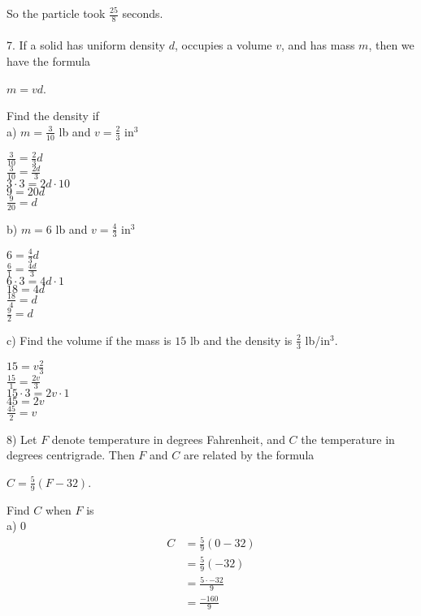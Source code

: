 \documentclass[12pt]{article}
\begin{document}
So the particle took $\displaystyle \frac{25}{8}$ seconds. \\
\\
7. If a solid has uniform density $d$, occupies a volume $v$, and has mass $m$, then we have the formula
\begin{center}
$m=vd$.
\end{center}
Find the density if \\
a) $m=\frac{3}{10}$ lb and $v=\frac{2}{3}$ in$^3$
\begin{center}
$\displaystyle \frac{3}{10}=\displaystyle \frac{2}{3}d$ \\
$\displaystyle \frac{3}{10}=\displaystyle \frac{2d}{3}$ \\
$3\cdot3=2d\cdot10$ \\
$9=20d$ \\
$\displaystyle \frac{9}{20}=d$
\end{center}
b) $m=6$ lb and $v=\frac{4}{3}$ in$^3$
\begin{center}
$6=\displaystyle \frac{4}{3}d$ \\
$\displaystyle \frac{6}{1}=\displaystyle \frac{4d}{3}$ \\
$6\cdot3=4d\cdot1$ \\
$18=4d$ \\
$\displaystyle \frac{18}{4}=d$ \\
$\displaystyle \frac{9}{2}=d$
\end{center}
c) Find the volume if the mass is $15$ lb and the density is $\frac{2}{3}$ lb/in$^3$.
\begin{center}
$15=v\displaystyle \frac{2}{3}$ \\
$\displaystyle \frac{15}{1}=\displaystyle \frac{2v}{3}$ \\
$15\cdot3=2v\cdot1$ \\
$45=2v$ \\
$\displaystyle \frac{45}{2}=v$
\end{center}
8) Let $F$ denote temperature in degrees Fahrenheit, and $C$ the temperature in degrees centrigrade. Then $F$ and $C$ are related by the formula
\begin{center}
$C=\frac{5}{9}(F-32)$.
\end{center}
Find $C$ when $F$ is \\
a) 0
\begin{align*}
C&=\displaystyle \frac{5}{9}(0-32) \\
&=\displaystyle \frac{5}{9}(-32) \\
&=\displaystyle \frac{5\cdot-32}{9} \\
&=\displaystyle \frac{-160}{9}
\end{align*}
\end{document}
